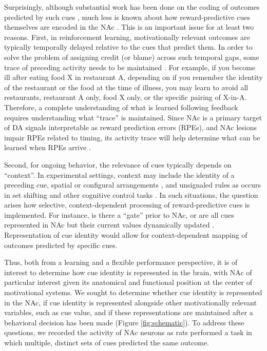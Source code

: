 \documentclass[11pt]{article}
\let\cite=\citep
\begin{document}
Surprisingly, although substantial work has been done on the coding of
outcomes predicted by such cues
\cite{Atallah2014,Bissonette2013,Cooch2015,Day2006,Goldstein2012,Hollerman1998,Lansink2012,McGinty2013,Nicola2004,Roesch2009a,Roitman2005,Saddoris2011,Setlow2003,Sugam2014,West2016},
much less is known about how reward-predictive cues themselves are
encoded in the NAc \cite{Sleezer2016}. This is an important issue for
at least two reasons. First, in reinforcement learning, motivationally
relevant outcomes are typically temporally delayed relative to the
cues that predict them. In order to solve the problem of assigning
credit (or blame) across such temporal gaps, some trace of preceding
activity needs to be maintained \cite{Lee2012,sutton1998}. For
example, if you become ill after eating food X in restaurant A,
depending on if you remember the identity of the restaurant or the
food at the time of illness, you may learn to avoid all restaurants,
restaurant A only, food X only, or the specific pairing of
X-in-A. Therefore, a complete understanding of what is learned
following feedback requires understanding what “trace” is
maintained. Since NAc is a primary target of DA signals interpretable
as reward prediction errors (RPEs), and NAc lesions impair RPEs
related to timing, its activity trace will help determine what can be
learned when RPEs arrive
\cite{Hamid2016,Hart2014,Ikemoto2007,McDannald2011,Takahashi2016}.


Second, for ongoing behavior, the relevance of cues typically depends
on “context”. In experimental settings, context may include the
identity of a preceding cue, spatial or configural arrangements
\cite{Holland1992,Bouton1993,Honey2014}, and unsignaled rules as
occurs in set shifting and other cognitive control tasks
\cite{Grant1948,cohen1992context,Floresco2006a,Sleezer2016}. In such
situations, the question arises how selective, context-dependent
processing of reward-predictive cues is implemented. For instance, is
there a “gate” prior to NAc, or are all cues represented in NAc but
their current values dynamically updated
\cite{Goto2008,Fitzgerald2014,Sleezer2016}. Representation of cue
identity would allow for context-dependent mapping of outcomes
predicted by specific cues.

Thus, both from a learning and a flexible performance perspective, it
is of interest to determine how cue identity is represented in the
brain, with NAc of particular interest given its anatomical and
functional position at the center of motivational systems. We sought
to determine whether cue identity is represented in the NAc, if cue
identity is represented alongside other motivationally relevant
variables, such as cue value, and if these representations are
maintained after a behavioral decision has been made (Figure
\ref{fig:schematic}). To address these questions, we recorded the
activity of NAc neurons as rats performed a task in which multiple,
distinct sets of cues predicted the same outcome.
\end{document}
